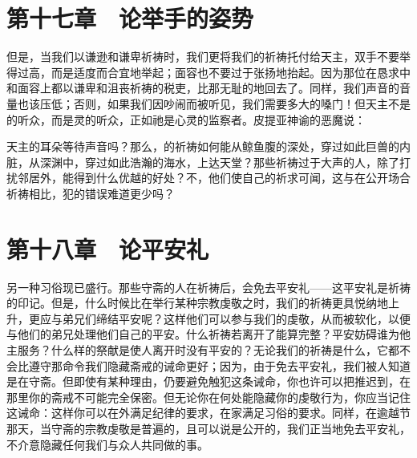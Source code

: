 
\section{第十七章　论举手的姿势}

但是，当我们以谦逊和谦卑祈祷时，我们更将我们的祈祷托付给天主，双手不要举得过高，而是适度而合宜地举起；面容也不要过于张扬地抬起。因为那位在恳求中和面容上都以谦卑和沮丧祈祷的税吏，比那无耻的地回去了。同样，我们声音的音量也该压低；否则，如果我们因吵闹而被听见，我们需要多大的嗓门！但天主不是的听众，而是灵的听众，正如祂是心灵的监察者。皮提亚神谕的恶魔说：\par

\par

天主的耳朵等待声音吗？那么，的祈祷如何能从鲸鱼腹的深处，穿过如此巨兽的内脏，从深渊中，穿过如此浩瀚的海水，上达天堂？那些祈祷过于大声的人，除了打扰邻居外，能得到什么优越的好处？不，他们使自己的祈求可闻，这与在公开场合祈祷相比，犯的错误难道更少吗？\par


\section{第十八章　论平安礼}

另一种习俗现已盛行。那些守斋的人在祈祷后，会免去平安礼——这平安礼是祈祷的印记。但是，什么时候比在举行某种宗教虔敬之时，我们的祈祷更具悦纳地上升，更应与弟兄们缔结平安呢？这样他们可以参与我们的虔敬，从而被软化，以便与他们的弟兄处理他们自己的平安。什么祈祷若离开了能算完整？平安妨碍谁为他主服务？什么样的祭献是使人离开时没有平安的？无论我们的祈祷是什么，它都不会比遵守那命令我们隐藏斋戒的诫命更好；因为，由于免去平安礼，我们被人知道是在守斋。但即使有某种理由，仍要避免触犯这条诫命，你也许可以把推迟到，在那里你的斋戒不可能完全保密。但无论你在何处能隐藏你的虔敬行为，你应当记住这诫命：这样你可以在外满足纪律的要求，在家满足习俗的要求。同样，在逾越节那天，当守斋的宗教虔敬是普遍的，且可以说是公开的，我们正当地免去平安礼，不介意隐藏任何我们与众人共同做的事。\par


